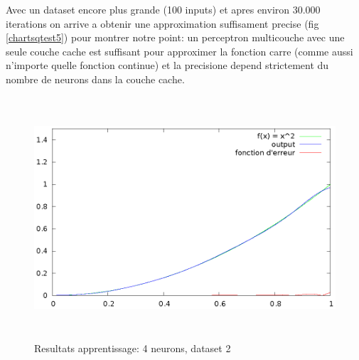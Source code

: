 \documentclass[twoside,openright,a4paper,11pt,french]{article}
\begin{document}
Avec un dataset encore plus grande (100 inputs) et apres environ
30.000 iterations on arrive a obtenir une approximation suffisament
precise (fig \ref{chartsqtest5}) pour montrer notre point:
un perceptron multicouche avec une seule couche cache est suffisant pour
approximer la fonction carre (comme aussi n'importe quelle fonction continue) 
et la precisione depend strictement du nombre de neurons dans la couche cache.

\begin{figure}[h]
\centering
\includegraphics[width=12cm,height=9cm]{./pics/chartsqtest5.eps}
\caption{Resultats apprentissage: 4 neurons, dataset 2}
\label{fig:chartsqtest5}
\end{figure}


\clearpage
{}


\end{document}
